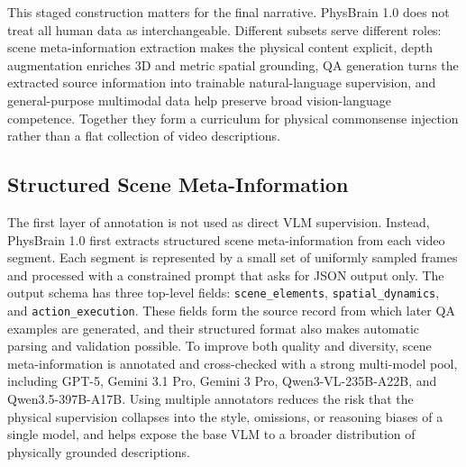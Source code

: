 This staged construction matters for the final narrative. PhysBrain 1.0 does not treat all human data as interchangeable. Different subsets serve different roles: scene meta-information extraction makes the physical content explicit, depth augmentation enriches 3D and metric spatial grounding, QA generation turns the extracted source information into trainable natural-language supervision, and general-purpose multimodal data help preserve broad vision-language competence. Together they form a curriculum for physical commonsense injection rather than a flat collection of video descriptions.

\subsection{Structured Scene Meta-Information}

The first layer of annotation is not used as direct VLM supervision. Instead, PhysBrain 1.0 first extracts structured scene meta-information from each video segment. Each segment is represented by a small set of uniformly sampled frames and processed with a constrained prompt that asks for JSON output only. The output schema has three top-level fields: \texttt{scene\_elements}, \texttt{spatial\_dynamics}, and \texttt{action\_execution}. These fields form the source record from which later QA examples are generated, and their structured format also makes automatic parsing and validation possible. To improve both quality and diversity, scene meta-information is annotated and cross-checked with a strong multi-model pool, including GPT-5, Gemini 3.1 Pro, Gemini 3 Pro, Qwen3-VL-235B-A22B, and Qwen3.5-397B-A17B. Using multiple annotators reduces the risk that the physical supervision collapses into the style, omissions, or reasoning biases of a single model, and helps expose the base VLM to a broader distribution of physically grounded descriptions.

